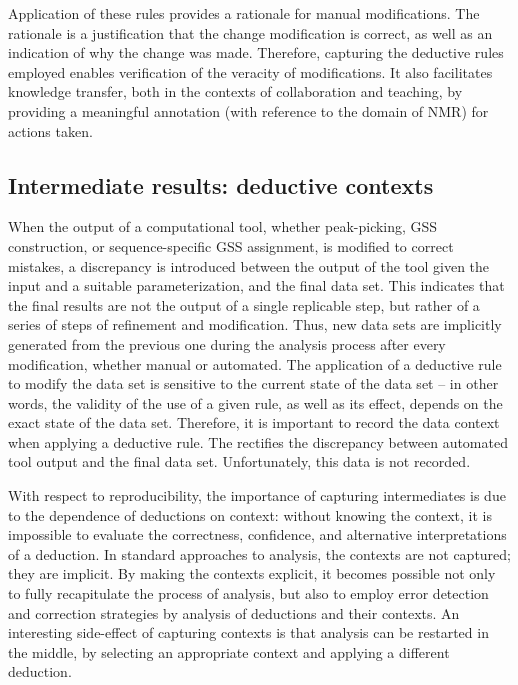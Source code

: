 Application of these rules provides a rationale for manual modifications.  The
rationale is a justification that the change modification is correct, as
well as an indication of why the change was made.  Therefore, capturing the
deductive rules employed enables verification of the veracity of modifications. 
It also facilitates knowledge transfer, both in the contexts of collaboration
and teaching, by providing a meaningful annotation (with reference to the
domain of NMR) for actions taken.


\subsection{Intermediate results: deductive contexts}
When the output of a computational tool, whether peak-picking, GSS construction, 
or sequence-specific GSS assignment, is modified to correct mistakes,
a discrepancy is introduced between the output of the tool 
given the input and a suitable parameterization, and the final data set. 
This indicates that the final results are not the output of a single 
replicable step, but rather of a series of steps of refinement and 
modification.  Thus, new data sets are implicitly generated from the previous
one during the analysis process after every modification, whether manual or automated.
The application of a deductive rule to modify the data set is sensitive to
the current state of the data set -- in other words, the validity of the 
use of a given rule, as well as its effect, depends on the exact state of
the data set.  Therefore, it is important to record the data context when
applying a deductive rule.  The rectifies the discrepancy between automated
tool output and the final data set.  Unfortunately, this data is not recorded.

With respect to reproducibility, the importance of capturing intermediates is 
due to the dependence of deductions on context: without knowing the context, 
it is impossible to evaluate the correctness, confidence, and alternative 
interpretations of a deduction.  In standard approaches to analysis, the 
contexts are not captured; they are implicit.  By making the contexts 
explicit, it becomes possible not only to fully recapitulate the process of 
analysis, but also to employ error detection and correction strategies by 
analysis of deductions and their contexts.  An interesting side-effect of 
capturing contexts is that analysis can be restarted in the middle, by 
selecting an appropriate context and applying a different deduction.


